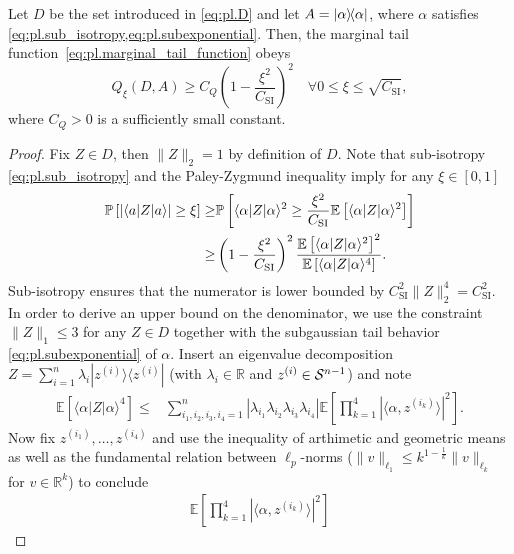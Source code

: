 \begin{lemma}
  Let $D$ be the set introduced in \cref{eq:pl.D} and let $ A = \ketbra\alpha$, where $\alpha$ satisfies \cref{eq:pl.sub_isotropy,eq:pl.subexponential}.
  Then, the marginal tail function~\eqref{eq:pl.marginal_tail_function} obeys
  \[
    Q_\xi (D,  A) \geq  C_Q \left( 1-  \frac{\xi^2}{C_\mathrm{SI}}\right)^2  \quad \forall 0 \leq \xi \leq \sqrt{C_\mathrm{SI}},
  \]
  where $C_Q>0$ is a sufficiently small constant.
\end{lemma}
\begin{proof}
  Fix $ Z \in D$, then $\|  Z \|_2 =1$ by definition of $D$.
  Note that sub-isotropy \eqref{eq:pl.sub_isotropy} and the Paley-Zygmund inequality imply for any $\xi \in [0,1]$
  \begin{align}
    \mathbb{P} \left[ | \langle  a|  Z | a \rangle| \geq \xi \right]
    \geq & \mathbb{P} \left[ \langle  \alpha|  Z | \alpha \rangle^2 \geq \frac{\xi^2}{C_\mathrm{SI}} \mathbb{E} \left[ \langle  \alpha| Z| \alpha \rangle^2 \right] \right] \\
    \geq & \left(1-\frac{\xi^2}{C_\mathrm{SI}}\right)^2 \frac{\mathbb{E} \left[ \langle  \alpha | Z | \alpha \rangle^2 \right]^2}{\mathbb{E} \left[ \langle  \alpha|  Z | \alpha \rangle^4 \right]}.
  \end{align}
  Sub-isotropy ensures that the numerator is lower bounded by $C_\mathrm{SI}^2 \|  Z \|_2^4 = C_\mathrm{SI}^2$.
  In order to derive an upper bound on the denominator, we use the constraint $\|  Z \|_1 \leq 3$ for any $ Z \in D$ together with the subgaussian tail behavior \eqref{eq:pl.subexponential} of $\alpha$.
  Insert an eigenvalue decomposition $ Z = \sum_{i=1}^n \lambda_i | z^{(i)} \rangle \! \langle  z^{(i)}|$ (with $\lambda_i \in \mathbb{R}$ and $ z^{(i)} \in \mathcal{S}^{n-1}$) and note
  \begin{align}
    \mathbb{E} \left[ \langle  \alpha|  Z | \alpha \rangle^4 \right]
    \leq & \sum_{i_1,i_2,i_3,i_4=1}^n | \lambda_{i_1} \lambda_{i_2} \lambda_{i_3} \lambda_{i_4} | \mathbb{E} \left[ \prod_{k=1}^4 | \langle  \alpha,  z^{(i_k)} \rangle|^2 \right]. \label{eq:pl.Q_aux1}
  \end{align}
  Now fix $ z^{(i_1)},\ldots, z^{(i_4)}$ and use the inequality of arthimetic and geometric means as well as the fundamental relation between $\ell_p$-norms ($\|  v \|_{\ell_1} \leq k^{1-\frac{1}{k}} \|  v \|_{\ell_k}$ for $v \in \mathbb{R}^k$) to conclude
  \begin{align}
    \mathbb{E} \left[ \prod_{k=1}^4 | \langle  \alpha, z^{(i_k)}\rangle |^2 \right]

\end{align}
\end{proof}
